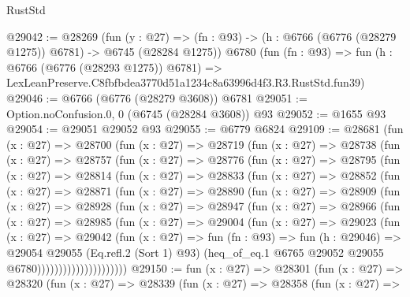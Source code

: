 \begin{lexlean}{RustStd}
\begin{coremodule}
@29042 := @28269
    (fun (y : @27) =>
    (fn : @93) -> (h : @6766 (@6776 (@28279 @1275)) @6781) -> @6745 (@28284 @1275))
    @6780
    (fun (fn : @93) =>
    fun (h : @6766 (@6776 (@28293 @1275)) @6781) =>
    LexLeanPreserve.C8fbfbdea3770d51a1234c8a63996d4f3.R3.RustStd.fun39)
@29046 := @6766 (@6776 (@28279 @3608)) @6781
@29051 := Option.noConfusion.{0, 0} (@6745 (@28284 @3608)) @93
@29052 := @1655 @93
@29054 := @29051 @29052 @93
@29055 := @6779 @6824
@29109 := @28681
    (fun (x : @27) =>
    @28700
      (fun (x : @27) =>
      @28719
        (fun (x : @27) =>
        @28738
          (fun (x : @27) =>
          @28757
            (fun (x : @27) =>
            @28776
              (fun (x : @27) =>
              @28795
                (fun (x : @27) =>
                @28814
                  (fun (x : @27) =>
                  @28833
                    (fun (x : @27) =>
                    @28852
                      (fun (x : @27) =>
                      @28871
                        (fun (x : @27) =>
                        @28890
                          (fun (x : @27) =>
                          @28909
                            (fun (x : @27) =>
                            @28928
                              (fun (x : @27) =>
                              @28947
                                (fun (x : @27) =>
                                @28966
                                  (fun (x : @27) =>
                                  @28985
                                    (fun (x : @27) =>
                                    @29004
                                      (fun (x : @27) =>
                                      @29023
                                        (fun (x : @27) =>
                                        @29042
                                          (fun (x : @27) =>
                                          fun (fn : @93) =>
                                          fun (h : @29046) =>
                                          @29054
                                            @29055
                                            (Eq.refl.{2} (Sort 1) @93)
                                            (heq_of_eq.{1}
                                              @6765
                                              @29052
                                              @29055
                                              @6780)))))))))))))))))))))
@29150 := fun (x : @27) =>
  @28301
    (fun (x : @27) =>
    @28320
      (fun (x : @27) =>
      @28339
        (fun (x : @27) =>
        @28358
          (fun (x : @27) =>

\end{coremodule}
\end{lexlean}
